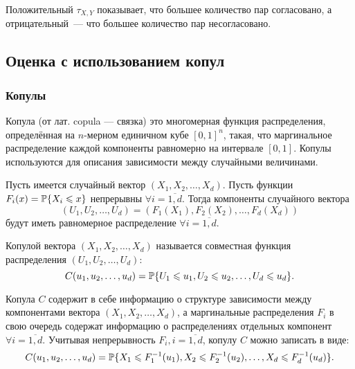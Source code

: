 Положительный $\tau_{X, Y}$ показывает, что большее количество пар согласовано, а отрицательный~--- что большее количество пар несогласовано.

\subsection*{Оценка с использованием копул}

\subsubsection*{Копулы}
Копула (от лат. copula --- связка) это многомерная функция распределения, определённая на $n$-мерном единичном кубе $[0, 1]^n$, такая, что маргинальное распределение каждой компоненты равномерно на интервале $[0, 1]$. Копулы используются для описания зависимости между случайными величинами.

\begin{define}
Пусть имеется случайный вектор $(X_1, X_2, \ldots, X_d)$. Пусть функции $F_i(x) = \P\{X_i \leq x\}$ непрерывны $\forall i = \overline{1, d}$. Тогда компоненты случайного вектора
\begin{equation}
(U_1, U_2, \ldots, U_d)= (F_1(X_1),F_2(X_2), \ldots, F_d(X_d))
\end{equation}
будут иметь равномерное распределение $\forall i = \overline{1, d}$.

Копулой вектора $(X_1, X_2, \ldots, X_d)$ называется совместная функция распределения $(U_1, U_2, \ldots, U_d)$:
\begin{equation}
C(u_1, u_2, \ldots, u_d)=\P\{U_1 \leq u_1, U_2 \leq u_2, \dots, U_d \leq u_d\}.
\end{equation}
\end{define}
Копула $C$ содержит в себе информацию о структуре зависимости между компонентами вектора $(X_1, X_2, \ldots, X_d)$, а маргинальные распределения $F_i$ в свою очередь содержат информацию о распределениях отдельных компонент $\forall i = \overline{1, d}$. Учитывая непрерывность $F_i, i = \overline{1, d}$, копулу $C$ можно записать в виде:
\begin{equation}
C(u_1, u_2, \ldots, u_d)=\P\{X_1 \leq F_1^{-1}(u_1), X_2 \leq F_2^{-1}(u_2), \ldots, X_d \leq F_d^{-1}(u_d)\}.
\end{equation}

